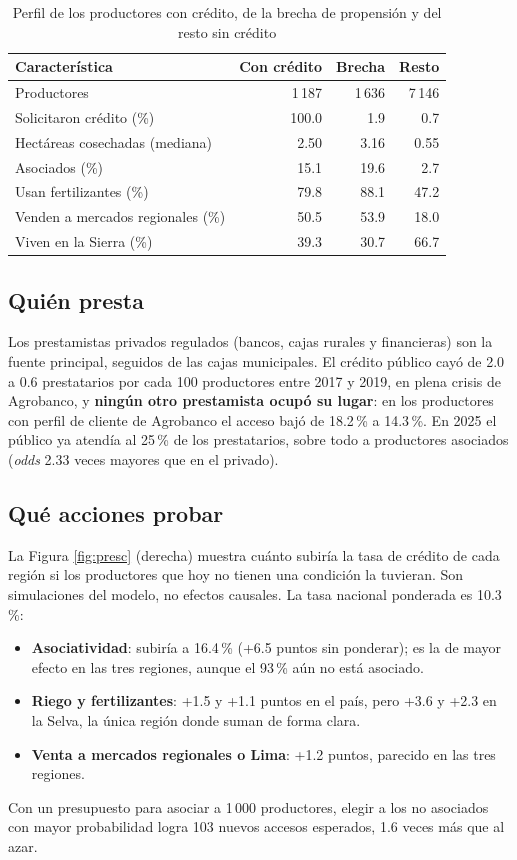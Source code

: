 \documentclass[12pt]{article}
\begin{document}
\begin{table}[!htb]
\centering
\caption{Perfil de los productores con crédito, de la brecha de propensión y del resto sin crédito}
\label{tab:perfil}
\begin{tabular}{lrrr}
\hline
Característica & Con crédito & Brecha & Resto \\
\hline
Productores & 1\,187 & 1\,636 & 7\,146 \\
Solicitaron crédito (\%) & 100.0 & 1.9 & 0.7 \\
Hectáreas cosechadas (mediana) & 2.50 & 3.16 & 0.55 \\
Asociados (\%) & 15.1 & 19.6 & 2.7 \\
Usan fertilizantes (\%) & 79.8 & 88.1 & 47.2 \\
Venden a mercados regionales (\%) & 50.5 & 53.9 & 18.0 \\
Viven en la Sierra (\%) & 39.3 & 30.7 & 66.7 \\
\hline
\end{tabular}
\end{table}

\subsection{Quién presta}
Los prestamistas privados regulados (bancos, cajas rurales y financieras) son la fuente principal, seguidos de las cajas municipales. El crédito público cayó de 2.0 a 0.6 prestatarios por cada 100 productores entre 2017 y 2019, en plena crisis de Agrobanco, y \textbf{ningún otro prestamista ocupó su lugar}: en los productores con perfil de cliente de Agrobanco el acceso bajó de 18.2\,\% a 14.3\,\%. En 2025 el público ya atendía al 25\,\% de los prestatarios, sobre todo a productores asociados (\textit{odds} 2.33 veces mayores que en el privado).

\subsection{Qué acciones probar}
La Figura \ref{fig:presc} (derecha) muestra cuánto subiría la tasa de crédito de cada región si los productores que hoy no tienen una condición la tuvieran. Son simulaciones del modelo, no efectos causales. La tasa nacional ponderada es 10.3\,\%:
\begin{itemize}
\item \textbf{Asociatividad}: subiría a 16.4\,\% (+6.5 puntos sin ponderar); es la de mayor efecto en las tres regiones, aunque el 93\,\% aún no está asociado.
\item \textbf{Riego y fertilizantes}: +1.5 y +1.1 puntos en el país, pero +3.6 y +2.3 en la Selva, la única región donde suman de forma clara.
\item \textbf{Venta a mercados regionales o Lima}: +1.2 puntos, parecido en las tres regiones.
\end{itemize}
Con un presupuesto para asociar a 1\,000 productores, elegir a los no asociados con mayor probabilidad logra 103 nuevos accesos esperados, 1.6 veces más que al azar.
\end{document}
